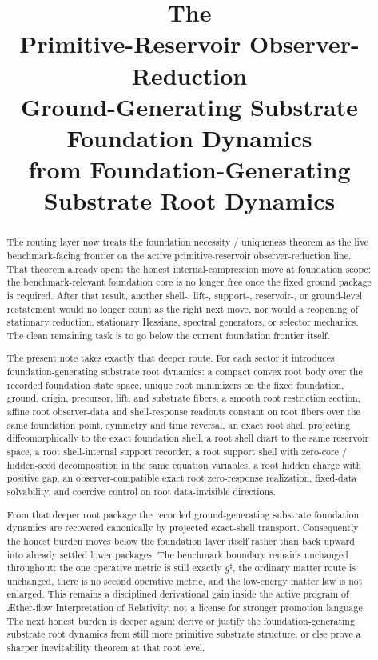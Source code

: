 \documentclass[11pt]{article}
\title{\textbf{The \TheoryName{}}\\[0.4em]
\large Primitive-Reservoir Observer-Reduction\\
\large Ground-Generating Substrate Foundation Dynamics\\
\large from Foundation-Generating Substrate Root Dynamics}
\author{}
\date{}
\newcommand{\Aflow}{\AE{}ther-flow}
\newcommand{\TheoryName}{\Aflow{} Interpretation of Relativity}
\newcommand{\CompletedMetric}{g^{\sharp}}
\begin{document}
\maketitle

\begin{abstract}
The routing layer now treats the foundation necessity / uniqueness theorem as the live benchmark-facing frontier on the active primitive-reservoir observer-reduction line. That theorem already spent the honest internal-compression move at foundation scope: the benchmark-relevant foundation core is no longer free once the fixed ground package is required. After that result, another shell-, lift-, support-, reservoir-, or ground-level restatement would no longer count as the right next move, nor would a reopening of stationary reduction, stationary Hessians, spectral generators, or selector mechanics. The clean remaining task is to go below the current foundation frontier itself.

The present note takes exactly that deeper route. For each sector it introduces foundation-generating substrate root dynamics: a compact convex root body over the recorded foundation state space, unique root minimizers on the fixed foundation, ground, origin, precursor, lift, and substrate fibers, a smooth root restriction section, affine root observer-data and shell-response readouts constant on root fibers over the same foundation point, symmetry and time reversal, an exact root shell projecting diffeomorphically to the exact foundation shell, a root shell chart to the same reservoir space, a root shell-internal support recorder, a root support shell with zero-core / hidden-seed decomposition in the same equation variables, a root hidden charge with positive gap, an observer-compatible exact root zero-response realization, fixed-data solvability, and coercive control on root data-invisible directions.

From that deeper root package the recorded ground-generating substrate foundation dynamics are recovered canonically by projected exact-shell transport. Consequently the honest burden moves below the foundation layer itself rather than back upward into already settled lower packages. The benchmark boundary remains unchanged throughout: the one operative metric is still exactly \(\CompletedMetric\), the ordinary matter route is unchanged, there is no second operative metric, and the low-energy matter law is not enlarged. This remains a disciplined derivational gain inside the active program of \TheoryName{}, not a license for stronger promotion language. The next honest burden is deeper again: derive or justify the foundation-generating substrate root dynamics from still more primitive substrate structure, or else prove a sharper inevitability theorem at that root level.
\end{abstract}
\end{document}
